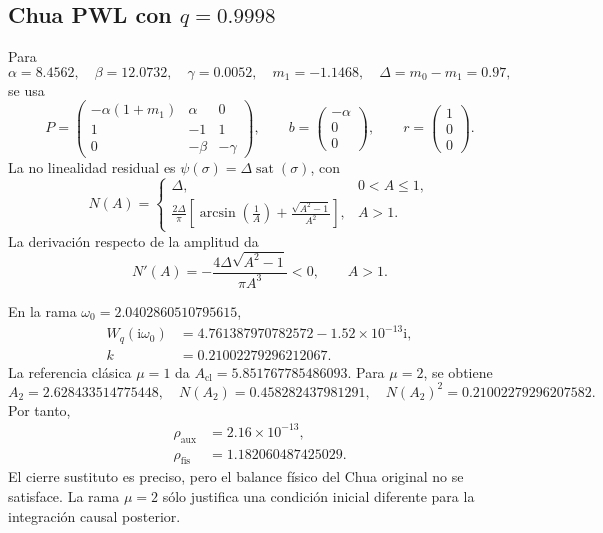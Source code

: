 \subsection[Chua PWL, q=0.9998]
{Chua PWL con \(q=0.9998\)}

Para
\[
 \alpha=8.4562,\quad \beta=12.0732,\quad \gamma=0.0052,
 \quad m_1=-1.1468,
 \quad \Delta=m_0-m_1=0.97,
\]
se usa
\begin{equation}
 P=\begin{pmatrix}
 -\alpha(1+m_1)&\alpha&0\\
 1&-1&1\\
 0&-\beta&-\gamma
 \end{pmatrix},\qquad
 b=\begin{pmatrix}-\alpha\\0\\0\end{pmatrix},\qquad
 r=\begin{pmatrix}1\\0\\0\end{pmatrix}.
 \label{eq:machado-chua-realization}
\end{equation}
La no linealidad residual es
\(\psi(\sigma)=\Delta\operatorname{sat}(\sigma)\), con
\begin{equation}
 N(A)=\begin{cases}
 \Delta,&0<A\leq1,\\[1mm]
 \displaystyle\frac{2\Delta}{\pi}
 \left[\arcsin\!\left(\frac1A\right)
 +\frac{\sqrt{A^2-1}}{A^2}\right],&A>1.
 \end{cases}
 \label{eq:machado-chua-df}
\end{equation}
La derivación respecto de la amplitud da
\begin{equation}
 N'(A)=-\frac{4\Delta\sqrt{A^2-1}}{\pi A^3}<0,
 \qquad A>1.
 \label{eq:machado-chua-monotone}
\end{equation}

En la rama \(\omega_0=2.0402860510795615\),
\begin{align}
 W_q(\mathrm i\omega_0)
 &=4.761387970782572-1.52\times10^{-13}\mathrm i,\\
 k&=0.21002279296212067.
\end{align}
La referencia clásica \(\mu=1\) da
\(A_{\mathrm{cl}}=5.851767785486093\). Para \(\mu=2\), se obtiene
\begin{equation}
 A_2=2.628433514775448,
 \quad N(A_2)=0.458282437981291,
 \quad N(A_2)^2=0.21002279296207582.
\end{equation}
Por tanto,
\begin{align}
 \rho_{\mathrm{aux}}&=2.16\times10^{-13},\\
 \rho_{\mathrm{fis}}&=1.182060487425029.
 \label{eq:machado-two-residuals-example}
\end{align}
El cierre sustituto es preciso, pero el balance físico del Chua original no
se satisface. La rama \(\mu=2\) sólo justifica una condición inicial diferente
para la integración causal posterior.

